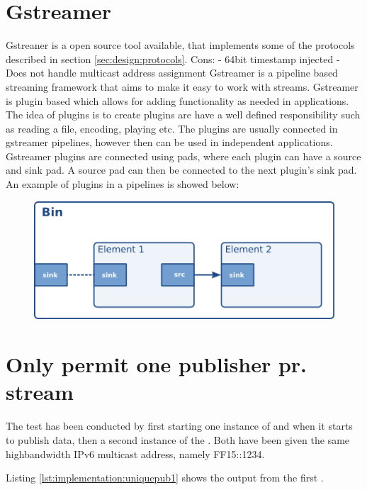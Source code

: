 \section{Gstreamer}
Gstreaner is a open source tool available, that implements some of the protocols described in section \ref{sec:design:protocols}.
Cons:
 - 64bit timestamp injected
 - Does not handle multicast address assignment
Gstreamer is a pipeline based streaming framework that aims to make it easy to work with streams. Gstreamer is plugin based which allows for adding functionality as needed in applications. The idea of plugins is to create plugins are have a well defined responsibility such as reading a file, encoding, playing etc. The plugins are usually connected in gstreamer pipelines, however then can be used in independent applications. Gstreamer plugins are connected using pads, where each plugin can have a source and sink pad. A source pad can then be connected to the next plugin's sink pad. An example of plugins in a pipelines is showed below:
\begin{figure}
	\includegraphics[width=1\textwidth]{figures/bin-element-ghost.png}
\end{figure}


\section{Only permit one publisher pr. stream}

The test has been conducted by first starting one instance of  and when it starts to publish data, then a second instance of the . Both  have been given the same highbandwidth IPv6 multicast address, namely FF15::1234.

Listing \ref{lst:implementation:uniquepub1} shows the output from the first .

